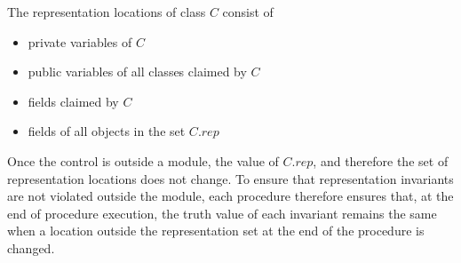 The representation locations of class $C$ consist of
\begin{itemize}
\item private variables of $C$
\item public variables of all classes claimed by $C$
\item fields claimed by $C$
\item fields of all objects in the set $C.rep$
\end{itemize}

Once the control is outside a module, the value of $C.rep$, and
therefore the set of representation locations does not change.  To
ensure that representation invariants are not violated outside the
module, each procedure therefore ensures that, at the end of procedure
execution, the truth value of each invariant remains the same when a
location outside the representation set at the end of the
procedure is changed.
